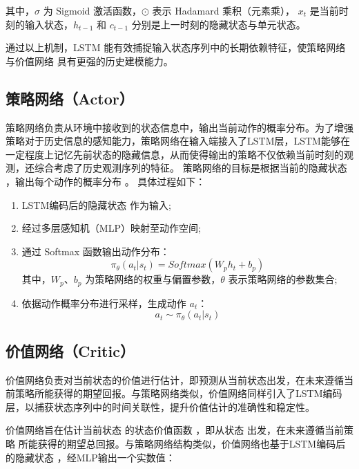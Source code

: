 其中，$\sigma$ 为 Sigmoid 激活函数，$\odot$ 表示 Hadamard 乘积（元素乘），
$x_t$ 是当前时刻的输入状态，$h_{t-1}$ 和 $c_{t-1}$ 分别是上一时刻的隐藏状态与单元状态。

通过以上机制，LSTM 能有效捕捉输入状态序列中的长期依赖特征，使策略网络与价值网络
具有更强的历史建模能力。

\subsection{策略网络（Actor）}

策略网络负责从环境中接收到的状态信息中，输出当前动作的概率分布。为了增强策略对于历史信息的感知能力，策略网络在输入端接入了LSTM层，LSTM能够在一定程度上记忆先前状态的隐藏信息，从而使得输出的策略不仅依赖当前时刻的观测，还综合考虑了历史观测序列的特征。
策略网络的目标是根据当前的隐藏状态 ，输出每个动作的概率分布 。
具体过程如下：

\begin{enumerate} [label=\arabic*)] 

\item LSTM编码后的隐藏状态  作为输入;

\item 经过多层感知机（MLP）映射至动作空间;

\item 通过 Softmax 函数输出动作分布：
\begin{equation}
\pi_{\theta}(a_t | s_t) = Softmax(W_p h_t + b_p)
\tag{4.8}
\end{equation}
其中，$W_p$、$b_p$ 为策略网络的权重与偏置参数，$\theta$ 表示策略网络的参数集合;

\item 依据动作概率分布进行采样，生成动作 $a_t$：
\begin{equation}
a_t \sim \pi_\theta(a_t | s_t)
\end{equation}

\end{enumerate}

\subsection{价值网络（Critic）}

价值网络负责对当前状态的价值进行估计，即预测从当前状态出发，在未来遵循当前策略所能获得的期望回报。与策略网络类似，价值网络同样引入了LSTM编码层，以捕获状态序列中的时间关联性，提升价值估计的准确性和稳定性。

价值网络旨在估计当前状态  的状态价值函数 ，即从状态  出发，在未来遵循当前策略  所能获得的期望总回报。与策略网络结构类似，价值网络也基于LSTM编码后的隐藏状态 ，经MLP输出一个实数值：

